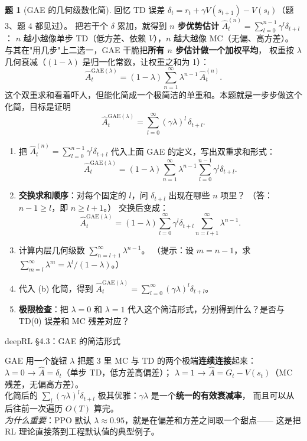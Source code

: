 \documentclass[11pt,a4paper]{article}
\theoremstyle{definition}
\newtheorem{problem}{题}
\begin{document}
\begin{problem}[GAE 的几何级数化简]
回忆 TD 误差 $\delta_t = r_t + \gamma V(s_{t+1}) - V(s_t)$（题 3、题 4 都见过）。
把若干个 $\delta$ 累加，就得到 \textbf{$n$ 步优势估计}
$\hat A_t^{(n)} = \sum_{l=0}^{n-1} \gamma^l \delta_{t+l}$：
$n$ 越小越像单步 TD（低方差、依赖 $V$），$n$ 越大越像 MC（无偏、高方差）。
与其在"用几步"上二选一，GAE 干脆把\textbf{所有 $n$ 步估计做一个加权平均}，
权重按 $\lambda$ 几何衰减（$(1-\lambda)$ 是归一化常数，让权重之和为 1）：
\[
\hat A_t^{\mathrm{GAE}(\lambda)} = (1-\lambda) \sum_{n=1}^\infty \lambda^{n-1}\, \hat A_t^{(n)}.
\]
这个双重求和看着吓人，但能化简成一个极简洁的单重和。本题就是一步步做这个化简，目标是证明
\[
\hat A_t^{\mathrm{GAE}(\lambda)} = \sum_{l=0}^\infty (\gamma\lambda)^l\, \delta_{t+l}.
\]

\begin{enumerate}[label=(\alph*)]
    \item 把 $\hat A_t^{(n)} = \sum_{l=0}^{n-1}\gamma^l\delta_{t+l}$ 代入上面 GAE 的定义，写出双重求和形式：
    \[
    \hat A_t^{\mathrm{GAE}(\lambda)} = (1-\lambda)\sum_{n=1}^\infty \lambda^{n-1} \sum_{l=0}^{n-1} \gamma^l \delta_{t+l}.
    \]
    \item \textbf{交换求和顺序}：对每个固定的 $l$，问 $\delta_{t+l}$ 出现在哪些 $n$ 项里？
    （答：$n - 1 \ge l$，即 $n \ge l+1$。）
    交换后变成：
    \[
    \hat A_t^{\mathrm{GAE}(\lambda)} = (1-\lambda)\sum_{l=0}^\infty \gamma^l \delta_{t+l} \sum_{n=l+1}^\infty \lambda^{n-1}.
    \]
    \item 计算内层几何级数 $\sum_{n=l+1}^\infty \lambda^{n-1}$。
    （提示：设 $m = n-1$，求 $\sum_{m=l}^\infty \lambda^m = \lambda^l / (1-\lambda)$。）
    \item 代入 (b) 化简，得到 $\hat A_t^{\mathrm{GAE}(\lambda)} = \sum_{l=0}^\infty (\gamma\lambda)^l \delta_{t+l}$。
    \item \textbf{极限检查}：把 $\lambda = 0$ 和 $\lambda = 1$ 代入这个简洁形式，分别得到什么？是否与 TD(0) 误差和 MC 残差对应？
\end{enumerate}
\begin{topicbox}
deepRL §4.3：GAE 的简洁形式
\end{topicbox}
\begin{takeaway}
GAE 用一个旋钮 $\lambda$ 把题 3 里 MC 与 TD 的两个极端\textbf{连续连接}起来：\\
$\lambda = 0$ → $\hat A = \delta_t$（单步 TD，低方差高偏差）；
$\lambda = 1$ → $\hat A = G_t - V(s_t)$（MC 残差，无偏高方差）。\\
化简后的 $\sum_l (\gamma\lambda)^l \delta_{t+l}$ 极其优雅：$\gamma\lambda$ 是一个\textbf{统一的有效衰减率}，
而且可以从后往前一次遍历 $O(T)$ 算完。\\
\textit{为什么重要}：PPO 默认 $\lambda \approx 0.95$，就是在偏差和方差之间取一个甜点——
这是把 RL 理论直接落到工程默认值的典型例子。
\end{takeaway}
\end{problem}
\end{document}

